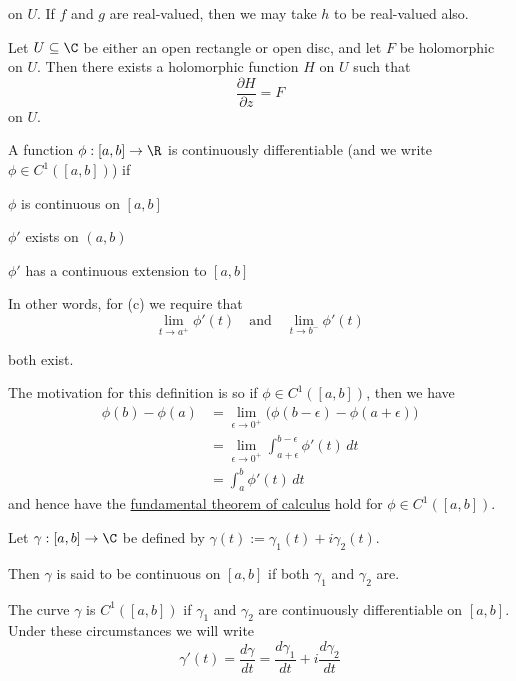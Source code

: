 on $U$. If $f$ and $g$ are real-valued, then we may take $h$ to be real-valued
also.

\label{e7808d1}

Let $U\subseteq\C$ be either an open rectangle or open disc, and let $F$ be
holomorphic on $U$. Then there exists a holomorphic function $H$ on $U$ such
that
$$
  \frac{\partial H}{\partial z}=F
$$
on $U$.

\label{c1f6d35}

A function $\phi:[a,b]\to\R$ is continuously differentiable (and we write
$\phi\in C^1([a,b])$) if

\begin{enumerata}
  \item $\phi$ is continuous on $[a,b]$
  \item $\phi'$ exists on $(a,b)$
  \item $\phi'$ has a continuous extension to $[a,b]$
\end{enumerata}

In other words, for (c) we require that
$$
  \lim_{t\to a^+}\phi'(t)\quad\text{and}\quad\lim_{t\to b^-}\phi'(t)
$$

both exist.

The motivation for this definition is so if $\phi\in C^1([a,b])$, then we have
\begin{align*}
  \phi(b)-\phi(a)
   &=\lim_{\epsilon\to0^+}\big(\phi(b-\epsilon)-\phi(a+\epsilon)\big) \\
   &=\lim_{\epsilon\to0^+}\int_{a+\epsilon}^{b-\epsilon}\phi'(t)\,dt  \\
   &=\int_a^b\phi'(t)\,dt
\end{align*}
and hence have the \href{b869dc0}{fundamental theorem of calculus}
hold for $\phi\in C^1([a,b])$.

\label{e4132bc}

Let $\gamma:[a,b]\to\C$ be defined by $\gamma(t):=\gamma_1(t) + i\gamma_2(t)$.

Then $\gamma$ is said to be continuous on $[a,b]$ if both $\gamma_1$ and
$\gamma_2$ are.

The curve $\gamma$ is $C^1([a,b])$ if $\gamma_1$ and $\gamma_2$ are
continuously differentiable on $[a,b]$. Under these circumstances we will write
$$
  \gamma'(t)=\frac{d\gamma}{dt}=\frac{d\gamma_1}{dt}+i\frac{d\gamma_2}{dt}
$$

\label{c511702}

